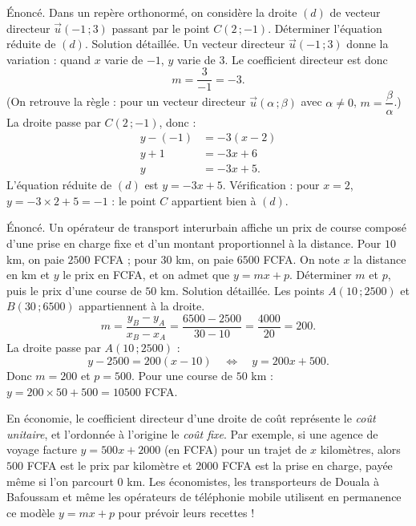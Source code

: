 \documentclass[11pt]{article}
\begin{document}
\begin{exoresolu}
Énoncé. Dans un repère orthonormé, on considère la droite $(d)$ de vecteur directeur $\vec{u}(-1\,; 3)$ passant par le point $C(2\,; -1)$. Déterminer l'équation réduite de $(d)$.
\tcblower
Solution détaillée. Un vecteur directeur $\vec{u}(-1\,; 3)$ donne la variation : quand $x$ varie de $-1$, $y$ varie de $3$. Le coefficient directeur est donc
\[ m = \dfrac{3}{-1} = -3. \]
(On retrouve la règle : pour un vecteur directeur $\vec{u}(\alpha\,; \beta)$ avec $\alpha \neq 0$, $m = \dfrac{\beta}{\alpha}$.) La droite passe par $C(2\,; -1)$, donc :
\begin{align*}
y - (-1) &= -3(x - 2) \\
y + 1 &= -3x + 6 \\
y &= -3x + 5.
\end{align*}
L'équation réduite de $(d)$ est $y = -3x + 5$. Vérification : pour $x = 2$, $y = -3 \times 2 + 5 = -1$ : le point $C$ appartient bien à $(d)$.
\end{exoresolu}

\begin{exoresolu}
Énoncé. Un opérateur de transport interurbain affiche un prix de course composé d'une prise en charge fixe et d'un montant proportionnel à la distance. Pour $10$ km, on paie $\num{2500}$ FCFA ; pour $30$ km, on paie $\num{6500}$ FCFA. On note $x$ la distance en km et $y$ le prix en FCFA, et on admet que $y = mx + p$. Déterminer $m$ et $p$, puis le prix d'une course de $50$ km.
\tcblower
Solution détaillée. Les points $A(10\,; \num{2500})$ et $B(30\,; \num{6500})$ appartiennent à la droite.
\[ m = \dfrac{y_B - y_A}{x_B - x_A} = \dfrac{\num{6500} - \num{2500}}{30 - 10} = \dfrac{\num{4000}}{20} = 200. \]
La droite passe par $A(10\,; \num{2500})$ :
\[ y - \num{2500} = 200(x - 10) \quad \Longleftrightarrow \quad y = 200x + 500. \]
Donc $m = 200$ et $p = 500$. Pour une course de $50$ km : $y = 200 \times 50 + 500 = \num{10500}$ FCFA.
\end{exoresolu}

\begin{savaistu}
En économie, le coefficient directeur d'une droite de coût représente le \emph{coût unitaire}, et l'ordonnée à l'origine le \emph{coût fixe}. Par exemple, si une agence de voyage facture $y = 500x + \num{2000}$ (en FCFA) pour un trajet de $x$ kilomètres, alors $500$ FCFA est le prix par kilomètre et $\num{2000}$ FCFA est la prise en charge, payée même si l'on parcourt $0$ km. Les économistes, les transporteurs de Douala à Bafoussam et même les opérateurs de téléphonie mobile utilisent en permanence ce modèle $y = mx + p$ pour prévoir leurs recettes !
\end{savaistu}
\end{document}
